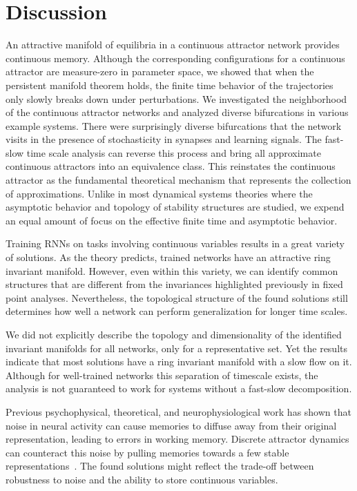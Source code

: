 \documentclass{article} %
\newcounter{ct}
\theoremstyle{definition}
\theoremstyle{remark}
\begin{document}
\section{Discussion}
An attractive manifold of equilibria in a continuous attractor network provides continuous memory.
Although the corresponding configurations for a continuous attractor are measure-zero in parameter space, we showed that when the persistent manifold theorem holds, the finite time behavior of the trajectories only slowly breaks down under perturbations.
We investigated the neighborhood of the continuous attractor networks and analyzed diverse bifurcations in various example systems.
There were surprisingly diverse bifurcations that the network visits in the presence of stochasticity in synapses and learning signals.
The fast-slow time scale analysis can reverse this process and bring all approximate continuous attractors into an equivalence class.
This reinstates the continuous attractor as the fundamental theoretical mechanism that represents the collection of approximations.
Unlike in most dynamical systems theories where the asymptotic behavior and topology of stability structures are studied, we expend an equal amount of focus on the effective finite time and asymptotic behavior.%

Training RNNs on tasks involving continuous variables results in a great variety of solutions.
As the theory predicts, trained networks have an attractive ring invariant manifold.
However, even within this variety, we can identify common structures that are different from the invariances highlighted previously in fixed point analyses.
Nevertheless, the topological structure of the found solutions still determines how well a network can perform generalization for longer time scales.

We did not explicitly describe the topology and dimensionality of the identified invariant manifolds for all networks, only for a representative set.
Yet the results indicate that most solutions have a ring invariant manifold with a slow flow on it.
Although for well-trained networks this separation of timescale exists, the analysis is not guaranteed to work for systems without a fast-slow decomposition.

Previous psychophysical, theoretical, and neurophysiological work has shown that noise in neural activity can cause memories to diffuse away from their original representation, leading to errors in working memory.
Discrete attractor dynamics can counteract this noise by pulling memories towards a few stable representations~\citep{panichello2019,Koulakov2002,Goldman2003-cz}.
The found solutions might reflect the trade-off between robustness to noise and the ability to store continuous variables.
\end{document}
